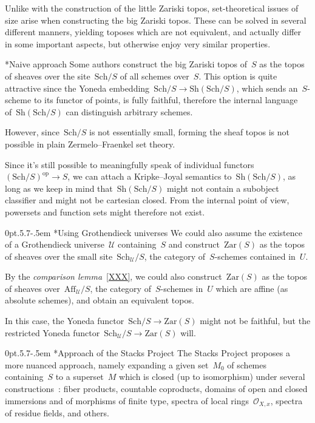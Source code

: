 \documentclass[10pt,reqno,a4paper]{amsbook}
\makeatletter
\theoremstyle{definition}
\theoremstyle{plain}
\theoremstyle{remark}
\renewcommand{\O}{\mathcal{O}}
\renewcommand{\U}{\mathcal{U}}
\newcommand{\Sh}{\mathrm{Sh}}
\newcommand{\Zar}{\mathrm{Zar}}
\newcommand{\Sch}{\mathrm{Sch}}
\newcommand{\Aff}{\mathrm{Aff}}
\newcommand{\op}{\mathrm{op}}
\newcommand{\?}{\,{:}\,}
\renewcommand{\_}{\mathpunct{.}\,}
\newcommand{\nocontentsline}[3]{}
\newcommand{\tocless}[1]{\let\addcontentsline=\nocontentsline}
\def\subsection{\@startsection{subsection}{2}%
  {0pt}{.5\linespacing\@plus.7\linespacing}{-.5em}%
  {\normalfont\bfseries}}
\makeatother
\begin{document}
Unlike with the construction of the little Zariski topos, set-theoretical
issues of size arise when constructing the big Zariski topos. These can be
solved in several different manners, yielding toposes which are not equivalent,
and actually differ in some important aspects, but otherwise enjoy very similar
properties.

{\tocless

\subsection*{Naive approach}
Some authors construct the big Zariski topos of~$S$ as the topos of
sheaves over the site~$\Sch/S$ of all schemes over~$S$. This option is quite
attractive since the Yoneda embedding~$\Sch/S \to \Sh(\Sch/S)$, which sends
an~$S$-scheme to its functor of points, is fully faithful, therefore the
internal language of~$\Sh(\Sch/S)$ can distinguish arbitrary schemes.

However, since~$\Sch/S$ is not essentially small, forming the sheaf topos is
not possible in plain Zermelo--Fraenkel set theory.

Since it's still possible to meaningfully speak of individual
functors~$(\Sch/S)^\op \to S$, we can attach a Kripke--Joyal semantics
to~$\Sh(\Sch/S)$, as long as we keep in mind that~$\Sh(\Sch/S)$ might
not contain a subobject classifier and might not be cartesian closed. From the
internal point of view, powersets and function sets might therefore not exist.

\subsection*{Using Grothendieck universes}
We could also assume the existence of a Gro\-then\-dieck universe~$\U$
containing~$S$ and construct~$\Zar(S)$ as the topos of sheaves over the
small site~$\Sch_\U/S$, the category of~$S$-schemes contained in~$U$.

By the \emph{comparison lemma}~\ref{XXX}, we could also construct~$\Zar(S)$ as
the topos of sheaves over~$\Aff_\U/S$, the category of~$S$-schemes in~$U$ which
are affine (as absolute schemes), and obtain an equivalent topos.

In this case, the Yoneda functor~$\Sch/S \to \Zar(S)$ might not be faithful,
but the restricted Yoneda functor~$\Sch_\U/S \to \Zar(S)$ will.

\subsection*{Approach of the Stacks Project}
The Stacks Project proposes a more nuanced approach, namely expanding a given
set~$M_0$ of schemes containing~$S$ to a superset~$M$ which is closed (up to
isomorphism) under several constructions~\cite[Tag~000H]{stacks-project}: fiber
products, countable coproducts, domains of open and closed immersions and of
morphisms of finite type, spectra of local rings~$\O_{X,x}$, spectra of residue
fields, and others.

}
\end{document}
